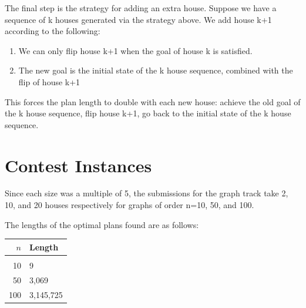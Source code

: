 \documentclass{article}
\begin{document}
The final step is the strategy for adding an extra house. Suppose we have a sequence of k houses generated via the strategy above. We add house k+1 according to the following:

\begin{enumerate}
\item We can only flip house k+1 when the goal of house k is satisfied.
\item The new goal is the initial state of the k house sequence, combined with the flip of house k+1
\end{enumerate}

This forces the plan length to double with each new house: achieve the old goal of the k house sequence, flip house k+1, go back to the initial state of the k house sequence.

\section{Contest Instances}

Since each size was a multiple of 5, the submissions for the graph track take 2, 10, and 20 houses respectively for graphs of order n=10, 50, and 100.

The lengths of the optimal plans found are as follows:

\vspace{1em}

\begin{center}
\begin{tabular}{rl}
    $n$ & Length \\[0.5em]
    \hline \\
    10  & 9 \\[0.5em]
    50  & 3,069 \\[0.5em]
    100 & 3,145,725
\end{tabular}
\end{center}

\end{document}
